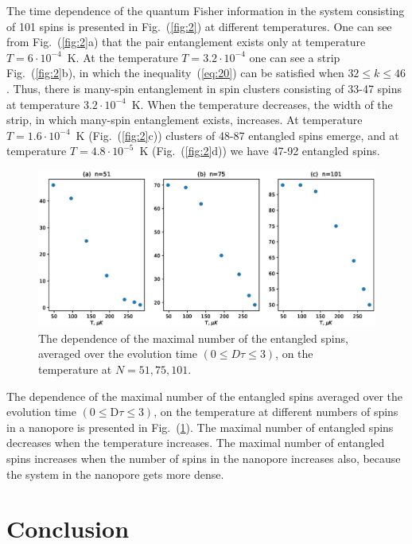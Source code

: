 \documentclass[review]{elsarticle}
\begin{document}
The time dependence of the quantum Fisher information in the system consisting of 101 spins is presented in Fig.~(\ref{fig:2}) at different temperatures. 
One can see from Fig.~(\ref{fig:2}a) that the pair entanglement exists only at temperature $T=6\cdot10^{-4}$~K.
At the temperature $T=3.2\cdot10^{-4}$ one can see a strip Fig.~(\ref{fig:2}b), in which the inequality~(\ref{eq:20}) can be satisfied when ${32}\leq {k}\leq{46}$.
Thus, there is many-spin entanglement in spin clusters consisting of 33-47 spins at temperature $3.2\cdot10^{-4}$~K.
When the temperature decreases, the width of the strip, in which many-spin entanglement exists, increases. 
At temperature $T=1.6\cdot10^{-4}$~K (Fig.~(\ref{fig:2}c)) clusters of 48-87 entangled spins emerge, and at temperature $T=4.8\cdot10^{-5}$~K (Fig.~(\ref{fig:2}d)) we have 47-92 entangled spins.

\begin{figure}
  	\includegraphics[width=0.95\linewidth]{entangled_spins_by_n.eps}
	\caption{
	    The dependence of the maximal number of the entangled spins,
	    averaged over the evolution time $(0 \leq D\tau \leq 3)$, 
	    on the temperature at $N=51, 75, 101$.
	}
	\label{fig:3}
\end{figure}

The dependence of the maximal number of the entangled spins averaged over the evolution time $({0}\leq \mathrm{D}\tau\leq{3})$, on the temperature at different numbers of spins in a nanopore is presented in Fig.~(\ref{fig:3}).
The maximal number of entangled spins decreases when the temperature increases. 
The maximal number of entangled spins increases when the number of spins in the nanopore increases also, because the system in the nanopore gets more dense. 



\section{Conclusion}
\label{sec:6}
\end{document}
